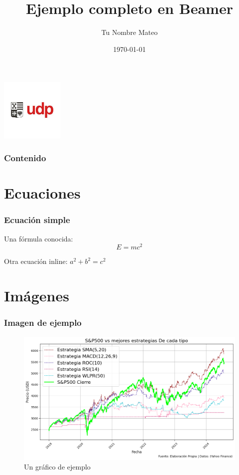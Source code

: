 \documentclass{beamer}
\title{Ejemplo completo en Beamer}
\author{Tu Nombre Mateo}
\institute{Tu Institución Udp}
\date{\today}
\begin{document}
\begin{frame}
  \titlepage
  \centering \includegraphics[width=3cm]{imagenes/logo.png}
  \end{frame}

\begin{frame}
  \frametitle{Contenido}
  \tableofcontents
\end{frame}

\section{Ecuaciones}

\begin{frame}
  \frametitle{Ecuación simple}
  Una fórmula conocida:
  \[
    E = mc^2
  \]

  Otra ecuación inline: \( a^2 + b^2 = c^2 \)
\end{frame}

\section{Imágenes}

\begin{frame}
  \frametitle{Imagen de ejemplo}
  \begin{figure}
    \centering
    \includegraphics[width=0.8\linewidth]{imagenes/Grafico1.png}
    \caption{Un gráfico de ejemplo}
  \end{figure}
\end{frame}
\end{document}

